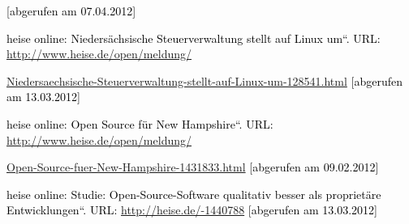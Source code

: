 \documentclass[a4paper]{article}
\newcommand\textstyleInternetlink[1]{\foreignlanguage{english}{\textcolor[rgb]{0.0,0.0,0.5019608}{#1}}}
\begin{document}
{
\textstyleInternetlink{\textcolor{black}{[abgerufen am 07.04.2012]}}}


\bigskip

{
\textstyleInternetlink{\textcolor{black}{heise online:
{\quotedblbase}Nieders\"achsische Steuerverwaltung stellt auf Linux
um{\textquotedblleft}. URL:
}}\href{http://www.heise.de/open/meldung/Niedersaechsische-Steuerverwaltung-stellt-auf-Linux-um-128541.html}{\textstyleInternetlink{http://www.heise.de/open/meldung/}}}

{
\href{http://www.heise.de/open/meldung/Niedersaechsische-Steuerverwaltung-stellt-auf-Linux-um-128541.html}{\textstyleInternetlink{Niedersaechsische-Steuerverwaltung-stellt-auf-Linux-um-128541.html}}\textstyleInternetlink{\textcolor{black}{
}}\textcolor{black}{[abgerufen am
}\foreignlanguage{english}{\textcolor{black}{13.03.2012]}}}


\bigskip

{
\textstyleInternetlink{\textcolor{black}{heise online:
{\quotedblbase}}}\textstyleInternetlink{\textcolor{black}{Open}}\textstyleInternetlink{\textcolor{black}{
}}\textstyleInternetlink{\textcolor{black}{Source}}\textstyleInternetlink{\textcolor{black}{
}}\textstyleInternetlink{\textcolor{black}{f\"ur}}\textstyleInternetlink{\textcolor{black}{
}}\textstyleInternetlink{\textcolor{black}{New}}\textstyleInternetlink{\textcolor{black}{
}}\textstyleInternetlink{\textcolor{black}{Hampshire}}\textstyleInternetlink{\textcolor{black}{{\textquotedblleft}}}\textstyleInternetlink{\textcolor{black}{.
URL:
}}\href{http://www.heise.de/open/meldung/Open-Source-fuer-New-Hampshire-1431833.html}{\textstyleInternetlink{http://www.heise.de/open/meldung/}}}

{
\href{http://www.heise.de/open/meldung/Open-Source-fuer-New-Hampshire-1431833.html}{\textstyleInternetlink{Open-Source-fuer-New-Hampshire-1431833.html}}\textstyleInternetlink{\textcolor{black}{
[abgerufen am 09.02.2012]}}}


\bigskip

{
\textstyleInternetlink{\textcolor{black}{heise online:
{\quotedblbase}Studie: Open-Source-Software qualitativ besser als
propriet\"are Entwicklungen{\textquotedblleft}. URL:
}}\url{http://heise.de/-1440788}\textstyleInternetlink{\textcolor{black}{
}}\textstyleInternetlink{\textcolor{black}{[abgerufen am
}}\textstyleInternetlink{\textcolor{black}{13.03.2012]}}}
\end{document}
